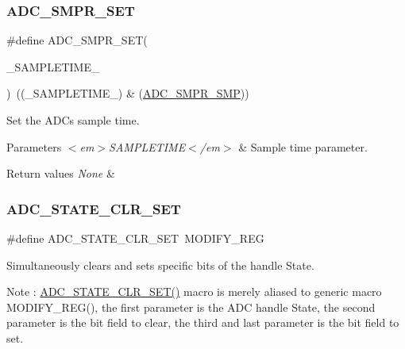 \subsubsection{\texorpdfstring{A\+D\+C\+\_\+\+S\+M\+P\+R\+\_\+\+S\+ET}{ADC\_SMPR\_SET}}
{\footnotesize\ttfamily \#define A\+D\+C\+\_\+\+S\+M\+P\+R\+\_\+\+S\+ET(\begin{DoxyParamCaption}\item[{}]{\+\_\+\+S\+A\+M\+P\+L\+E\+T\+I\+M\+E\+\_\+ }\end{DoxyParamCaption})~((\+\_\+\+S\+A\+M\+P\+L\+E\+T\+I\+M\+E\+\_\+) \& (\hyperlink{group___peripheral___registers___bits___definition_gaceac2124a2a41388f9f5e5c2c310a27e}{A\+D\+C\+\_\+\+S\+M\+P\+R\+\_\+\+S\+MP}))}



Set the A\+DC\textquotesingle{}s sample time. 


\begin{DoxyParams}{Parameters}
{\em $<$em$>$\+S\+A\+M\+P\+L\+E\+T\+I\+M\+E$<$/em$>$} & Sample time parameter. \\
\hline
\end{DoxyParams}

\begin{DoxyRetVals}{Return values}
{\em None} & \\
\hline
\end{DoxyRetVals}
\mbox{\label{group___a_d_c___private___macros_gaaf93e91b164d4a220aae475eff82665f}} 
\subsubsection{\texorpdfstring{A\+D\+C\+\_\+\+S\+T\+A\+T\+E\+\_\+\+C\+L\+R\+\_\+\+S\+ET}{ADC\_STATE\_CLR\_SET}}
{\footnotesize\ttfamily \#define A\+D\+C\+\_\+\+S\+T\+A\+T\+E\+\_\+\+C\+L\+R\+\_\+\+S\+ET~M\+O\+D\+I\+F\+Y\+\_\+\+R\+EG}



Simultaneously clears and sets specific bits of the handle State. 

\begin{DoxyNote}{Note}
\+: \hyperlink{group___a_d_c___private___macros_gaaf93e91b164d4a220aae475eff82665f}{A\+D\+C\+\_\+\+S\+T\+A\+T\+E\+\_\+\+C\+L\+R\+\_\+\+S\+E\+T()} macro is merely aliased to generic macro M\+O\+D\+I\+F\+Y\+\_\+\+R\+E\+G(), the first parameter is the A\+DC handle State, the second parameter is the bit field to clear, the third and last parameter is the bit field to set. 
\end{DoxyNote}

